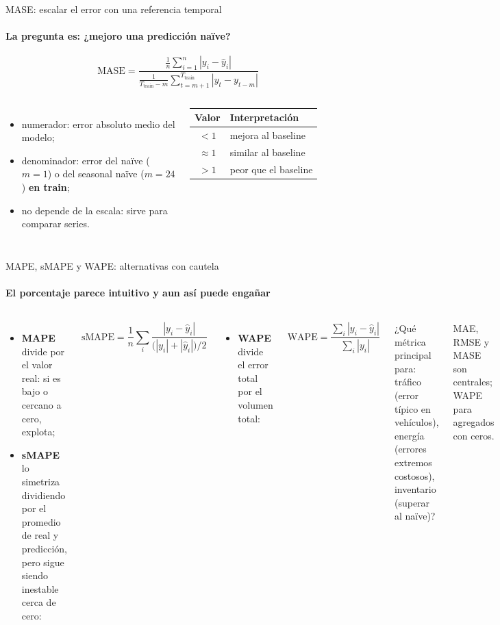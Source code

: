 \documentclass[aspectratio=169,11pt]{beamer}  %
\newcommand{\hrow}{\rowcolor{mlcream}}
\begin{document}
\begin{frame}{MASE: escalar el error con una referencia temporal}
\framesubtitle{La pregunta es: ¿mejoro una predicción naïve?}
{\large\[ \mathrm{MASE} = \frac{\frac{1}{n}\sum_{i=1}^{n} |y_i - \hat y_i|}{\frac{1}{T_{\mathrm{train}}-m}\sum_{t=m+1}^{T_{\mathrm{train}}} |y_t - y_{t-m}|} \]}
\begin{columns}[T]
\begin{itemize}\small
\item numerador: error absoluto medio del modelo;
\item denominador: error del naïve ($m = 1$) o del seasonal naïve ($m = 24$) \textbf{en train};
\item no depende de la escala: sirve para comparar series.
\end{itemize}
\centering\small
\begin{tabular}{@{}c l@{}}
\toprule
\hrow \textbf{Valor} & Interpretación\\
\midrule
$< 1$ & mejora al baseline\\
$\approx 1$ & similar al baseline\\
$> 1$ & peor que el baseline\\
\bottomrule
\end{tabular}
\end{columns}
\end{frame}

\begin{frame}{MAPE, sMAPE y WAPE: alternativas con cautela}
\framesubtitle{El porcentaje parece intuitivo y aun así puede engañar}
\begin{columns}[T]
\begin{itemize}\small
\item \textbf{MAPE} divide por el valor real: si es bajo o cercano a cero, explota;
\item \textbf{sMAPE} lo simetriza dividiendo por el promedio de real y predicción, pero sigue siendo inestable cerca de cero:
\end{itemize}
\[ \mathrm{sMAPE} = \frac{1}{n}\sum_i \frac{|y_i - \hat y_i|}{\big(|y_i| + |\hat y_i|\big)/2} \]
\begin{itemize}\small
\item \textbf{WAPE} divide el error total por el volumen total:
\end{itemize}
\[ \mathrm{WAPE} = \frac{\sum_i |y_i - \hat y_i|}{\sum_i |y_i|} \]
\begin{taskbox}[Práctica]
\small ¿Qué métrica principal para: tráfico (error típico en vehículos), energía (errores extremos costosos), inventario (superar al naïve)?
\end{taskbox}
\begin{goldbox}
\small MAE, RMSE y MASE son centrales; WAPE para agregados con ceros.
\end{goldbox}
\end{columns}
\end{frame}
\end{document}
